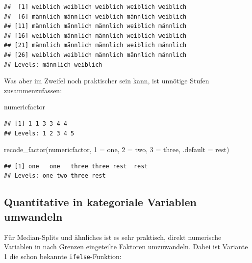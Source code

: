 \documentclass[
]{book}
\newenvironment{Shaded}{\begin{snugshade}}{\end{snugshade}}
\newcommand{\AttributeTok}[1]{\textcolor[rgb]{0.77,0.63,0.00}{#1}}
\newcommand{\FunctionTok}[1]{\textcolor[rgb]{0.00,0.00,0.00}{#1}}
\newcommand{\NormalTok}[1]{#1}
\newcommand{\OtherTok}[1]{\textcolor[rgb]{0.56,0.35,0.01}{#1}}
\newcommand{\StringTok}[1]{\textcolor[rgb]{0.31,0.60,0.02}{#1}}
\begin{document}
\begin{verbatim}
##  [1] weiblich weiblich weiblich weiblich weiblich
##  [6] männlich männlich weiblich männlich weiblich
## [11] männlich männlich männlich weiblich männlich
## [16] weiblich männlich männlich weiblich weiblich
## [21] männlich männlich männlich weiblich männlich
## [26] weiblich weiblich männlich männlich männlich
## Levels: männlich weiblich
\end{verbatim}

Was aber im Zweifel noch praktischer sein kann, ist unnötige Stufen zusammenzufassen:

\begin{Shaded}
\begin{Highlighting}[]
\NormalTok{numericfactor}
\end{Highlighting}
\end{Shaded}

\begin{verbatim}
## [1] 1 1 3 3 4 4
## Levels: 1 2 3 4 5
\end{verbatim}

\begin{Shaded}
\begin{Highlighting}[]
\FunctionTok{recode\_factor}\NormalTok{(numericfactor,}
              \StringTok{\textquotesingle{}1\textquotesingle{}} \OtherTok{=} \StringTok{\textquotesingle{}one\textquotesingle{}}\NormalTok{,}
              \StringTok{\textquotesingle{}2\textquotesingle{}} \OtherTok{=} \StringTok{\textquotesingle{}two\textquotesingle{}}\NormalTok{,}
              \StringTok{\textquotesingle{}3\textquotesingle{}} \OtherTok{=} \StringTok{\textquotesingle{}three\textquotesingle{}}\NormalTok{,}
              \AttributeTok{.default =} \StringTok{\textquotesingle{}rest\textquotesingle{}}\NormalTok{)}
\end{Highlighting}
\end{Shaded}

\begin{verbatim}
## [1] one   one   three three rest  rest 
## Levels: one two three rest
\end{verbatim}

\hypertarget{quantitative-in-kategoriale-variablen-umwandeln}{%
\subsection{Quantitative in kategoriale Variablen umwandeln}\label{quantitative-in-kategoriale-variablen-umwandeln}}

Für Median-Splits und ähnliches ist es sehr praktisch, direkt numerische Variablen in nach Grenzen eingeteilte Faktoren umzuwandeln. Dabei ist Variante 1 die schon bekannte \texttt{ifelse}-Funktion:
\end{document}

